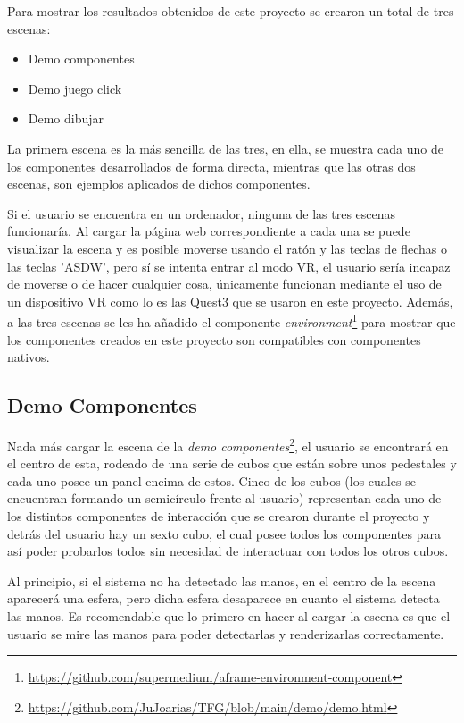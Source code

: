 \documentclass[a4paper, 12pt]{book}
\begin{document}
Para mostrar los resultados obtenidos de este proyecto se crearon un total de tres escenas:
\begin{itemize}
  \item Demo componentes
  \item Demo juego click
  \item Demo dibujar
\end{itemize}

La primera escena es la más sencilla de las tres, en ella, se muestra cada uno de los componentes desarrollados de forma directa, mientras que las otras dos escenas, son ejemplos aplicados de dichos componentes.

Si el usuario se encuentra en un ordenador, ninguna de las tres escenas funcionaría. Al cargar la página web correspondiente a cada una se puede visualizar la escena y es posible moverse usando el ratón y las teclas de flechas o las teclas 'ASDW', pero sí se intenta entrar al modo VR,
el usuario sería incapaz de moverse o de hacer cualquier cosa, únicamente funcionan mediante el uso de un dispositivo VR como lo es las Quest3 que se usaron en este proyecto. Además, a las tres escenas se les ha añadido el componente \textit{environment}\footnote{\url{https://github.com/supermedium/aframe-environment-component}} para mostrar que los componentes creados en este proyecto son compatibles con componentes nativos.

\subsection{Demo Componentes}
\label{subsec:demo-componentes}
Nada más cargar la escena de la \textit{demo componentes}\footnote{\url{https://github.com/JuJoarias/TFG/blob/main/demo/demo.html}}, el usuario se encontrará en el centro de esta, rodeado de una serie de cubos que están sobre unos pedestales y cada uno posee un panel encima de estos. Cinco de los cubos (los cuales se encuentran formando un semicírculo frente al usuario) representan cada uno de los distintos componentes de interacción que se crearon durante el proyecto y detrás del usuario hay un sexto cubo, el cual posee todos los componentes para así poder probarlos todos sin necesidad de interactuar con todos los otros cubos.

Al principio, si el sistema no ha detectado las manos, en el centro de la escena aparecerá una esfera, pero dicha esfera desaparece en cuanto el sistema detecta las manos. Es recomendable que lo primero en hacer al cargar la escena es que el usuario se mire las manos para poder detectarlas y renderizarlas correctamente. 
\end{document}
